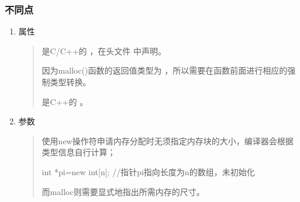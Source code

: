 \documentclass[letterpaper,10pt,english]{sphinxmanual}
\begin{document}
\subsubsection{不同点}
\label{\detokenize{cpp/02_array:id9}}\begin{enumerate}
\item {} 
属性
\begin{quote}

 是C/C++的  ，在头文件  中声明。

%
\begin{sphinxVerbatim}[commandchars=\\\{\}]
  
  
\end{sphinxVerbatim}

因为malloc()函数的返回值类型为  ，所以需要在函数前面进行相应的强制类型转换。

 是C++的  。
\end{quote}

\item {} 
参数
\begin{quote}

使用new操作符申请内存分配时无须指定内存块的大小，编译器会根据类型信息自行计算；

%
\begin{sphinxVerbatim}[commandchars=\\\{\}]
int *pi=new int[n]; //指针pi指向长度为n的数组，未初始化
\end{sphinxVerbatim}

而malloc则需要显式地指出所需内存的尺寸。

%
\begin{sphinxVerbatim}[commandchars=\\\{\}]
   
   
\end{sphinxVerbatim}


\end{quote}
\end{enumerate}
\end{document}
